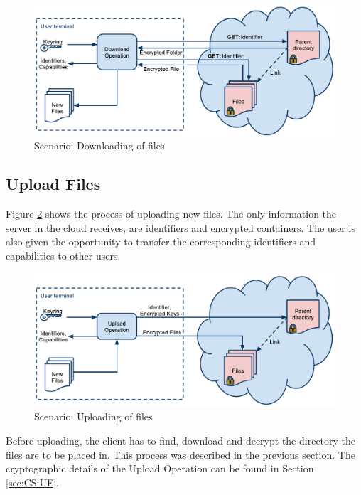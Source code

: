 \documentclass[english,12pt,a4paper]{book}
\begin{document}
\begin{figure}[h!]
    \centering
    \includegraphics[width=\columnwidth]{ArchitectureDownload.pdf}
    \caption{Scenario: Downloading of files}
    \label{fig:AS:download}
\end{figure}

\subsection{Upload Files}

Figure \ref{fig:AS:upload} shows the process of uploading new files. The only
information the server in the cloud receives, are identifiers and encrypted
containers. The user is also given the opportunity to transfer the corresponding
identifiers and capabilities to other users.

\begin{figure}[h!]
    \centering
    \includegraphics[width=\columnwidth]{ArchitectureUpload.pdf}
    \caption{Scenario: Uploading of files}
    \label{fig:AS:upload}
\end{figure}

Before uploading, the client has to find, download and decrypt the directory the
files are to be placed in. This process was described in the previous section.
The cryptographic details of the Upload Operation can be found in Section
\ref{sec:CS:UF}.
\end{document}
